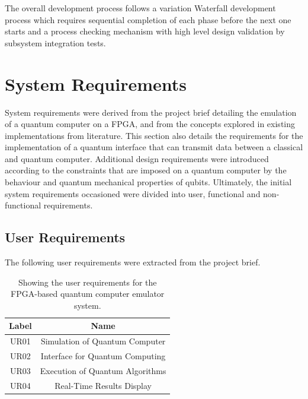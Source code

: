 The overall development process follows a variation Waterfall development process which requires sequential completion of each phase before the next one starts and a process checking mechanism with high level design validation by subsystem integration tests.

\section{System Requirements \label{sec:method-sys-requirements}}

System requirements were derived from the project brief detailing the emulation of a quantum computer on a FPGA, and from the concepts explored in existing implementations from literature. This section also details the requirements for the implementation of a quantum interface that can transmit data between a classical and quantum computer. Additional design requirements were introduced according to the constraints that are imposed on a quantum computer by the behaviour and quantum mechanical properties of qubits. Ultimately, the initial system requirements occasioned were divided into user, functional and non-functional requirements.

\subsection{User Requirements \label{subsec:method-user-req}}

The following user requirements were extracted from the project brief.

\begin{table}[ht!]
	\centering
	\caption[User System Requirements.]{Showing the user requirements for the FPGA-based quantum computer emulator system.}
	\label{tab:urs}
	\begin{tabular}{ |c|c| } 
		\hline
		\textbf{Label} & \textbf{Name}\\ 
		\hline
		UR01 & Simulation of Quantum Computer \\ 
		\hline
		UR02 & Interface for Quantum Computing \\ 
		\hline
		UR03 & Execution of Quantum Algorithms \\ 
		\hline
		UR04 & Real-Time Results Display \\ 
		\hline
	\end{tabular}
\end{table}

